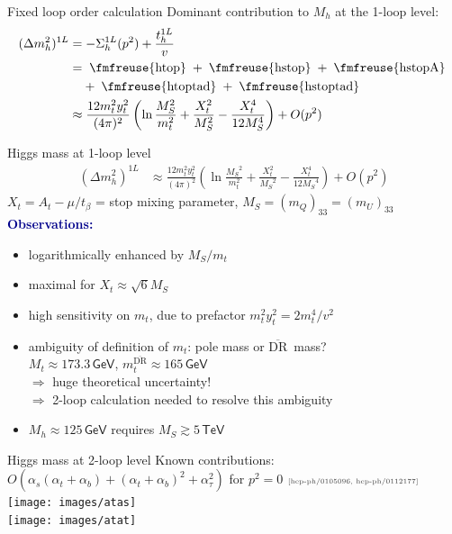 \documentclass[hyperref={pdfpagelabels=false},ngerman]{beamer}
\newcommand{\fmfvcenter}[1]{\;\vcenter{\hbox{\fmfreuse{#1}}}\;}
\newcommand{\eh}[1]{\,\mathsf{#1}}
\newcommand{\MS}{\ensuremath{M_S}}
\newcommand{\mycite}[1]{\ensuremath{\text{\textcolor{darkgray}{\tiny [#1]}}}}
\renewcommand{\emph}[1]{\textbf{\textcolor{darkblue}{#1}}}
\newcommand{\DRbar}{\ensuremath{\overline{\text{DR}}}}
\newcommand{\at}{\alpha_t}
\newcommand{\ab}{\alpha_b}
\newcommand{\atau}{\alpha_\tau}
\newcommand{\as}{\alpha_s}
\begin{document}
\begin{frame}{Fixed loop order calculation}
  Dominant contribution to $M_h$ at the 1-loop level:
  \begin{align*}
    (\Delta m_h^2)^{1L} &= -\Sigma_h^{1L}(p^2) + \frac{t_h^{1L}}{v} \\
    &= \fmfvcenter{htop} + \fmfvcenter{hstop} + \fmfvcenter{hstopA} \\
    &\phantom{={}} + \fmfvcenter{htoptad} + \fmfvcenter{hstoptad} \\
    &\approx \frac{12 m_t^2 y_t^2}{(4\pi)^2} \left(
      \ln\frac{\MS^2}{m_t^2}
      + \frac{X_t^2}{\MS^2}
      - \frac{X_t^4}{12 \MS^4}
    \right) + O(p^2)
  \end{align*}
\end{frame}

\begin{frame}{Higgs mass at 1-loop level}
  \begin{align*}
    (\Delta m_h^2)^{1L} &\approx
    \frac{12 m_t^2 y_t^2}{(4\pi)^2} \left(
      \ln\frac{\MS^2}{m_t^2}
      + \frac{X_t^2}{\MS^2}
      - \frac{X_t^4}{12 \MS^4}
    \right) + O(p^2)
  \end{align*}
  $X_t = A_t - \mu/t_\beta$ = stop mixing parameter,
  $\MS = (m_Q)_{33} = (m_U)_{33}$
  \\[1em]
  \emph{Observations:}
  \begin{itemize}
  \item logarithmically enhanced by $\MS / m_t$
  \item maximal for $X_t \approx \sqrt{6} \MS$
  \item high sensitivity on $m_t$, due to prefactor $m_t^2 y_t^2 = 2 m_t^4/v^2$
  \item ambiguity of definition of $m_t$: pole mass or \DRbar\ mass? \\
    $M_t \approx 173.3\eh{GeV}$, $m_t^{\DRbar} \approx 165\eh{GeV}$ \\
    $\Rightarrow$ huge theoretical uncertainty!\\
    $\Rightarrow$ 2-loop calculation needed to resolve this ambiguity
  \item $M_h \approx 125\eh{GeV}$ requires $\MS \gtrsim 5\eh{TeV}$
  \end{itemize}
\end{frame}

\begin{frame}{Higgs mass at 2-loop level}
  Known contributions: $O(\as (\at + \ab) + (\at+\ab)^2 + \atau^2)$
  for $p^2 = 0$ \mycite{hep-ph/0105096, hep-ph/0112177}
  \\[1em]
  \texttt{[image: images/atas]}\\[1em]
  \texttt{[image: images/atat]}
\end{frame}
\end{document}

